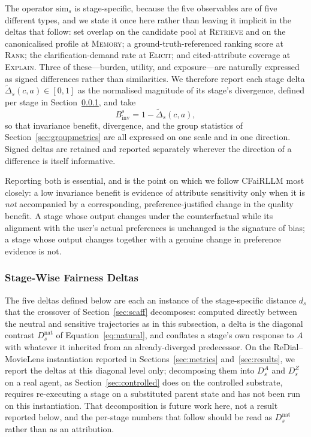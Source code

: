 \documentclass[manuscript,screen,review]{acmart}
\newcommand{\Dnorm}{\widetilde{\Delta}}
\newcommand{\Binv}{B^{s}_{\mathrm{inv}}}
\newcommand{\stage}[1]{\textsc{#1}}
\begin{document}
The operator $\mathrm{sim}_s$ is stage-specific, because the five observables are
of five different types, and we state it once here rather than leaving it implicit
in the deltas that follow: set overlap on the candidate pool at \stage{Retrieve}
and on the canonicalised profile at \stage{Memory}; a ground-truth-referenced
ranking score at \stage{Rank}; the clarification-demand rate at \stage{Elicit};
and cited-attribute coverage at \stage{Explain}. Three of these---burden, utility,
and exposure---are naturally expressed as signed differences rather than
similarities. We therefore report each stage delta $\Dnorm_s(c,a) \in [0,1]$ as the
normalised magnitude of its stage's divergence, defined per stage in
Section~\ref{sec:stage-deltas}, and take
\begin{equation}
  \Binv = 1 - \Dnorm_s(c,a),
  \label{eq:binvnorm}
\end{equation}
so that invariance benefit, divergence, and the group statistics of
Section~\ref{sec:groupmetrics} are all expressed on one scale and in one
direction. Signed deltas are retained and reported separately wherever the
direction of a difference is itself informative.

Reporting both is essential, and is the point on which we follow CFaiRLLM most
closely: a low invariance benefit is evidence of attribute sensitivity only when
it is \emph{not} accompanied by a corresponding, preference-justified change in
the quality benefit. A stage whose output changes under the counterfactual while
its alignment with the user's actual preferences is unchanged is the signature of
bias; a stage whose output changes together with a genuine change in preference
evidence is not.

\subsubsection{Stage-Wise Fairness Deltas}
\label{sec:stage-deltas}

The five deltas defined below are each an instance of the stage-specific distance $d_s$ that the
crossover of Section~\ref{sec:scaff} decomposes: computed directly between the neutral and
sensitive trajectories as in this subsection, a delta is the diagonal contrast $D_s^{\mathrm{nat}}$
of Equation~\eqref{eq:natural}, and conflates a stage's own response to $A$ with whatever it
inherited from an already-diverged predecessor. On the ReDial--MovieLens instantiation reported in
Sections~\ref{sec:metrics} and~\ref{sec:results}, we report the deltas at this diagonal level
only; decomposing them into $D_s^{A}$ and $D_s^{Z}$ on a real agent, as Section~\ref{sec:controlled}
does on the controlled substrate, requires re-executing a stage on a substituted parent state and
has not been run on this instantiation. That decomposition is future work here, not a result
reported below, and the per-stage numbers that follow should be read as $D_s^{\mathrm{nat}}$
rather than as an attribution.
\end{document}
